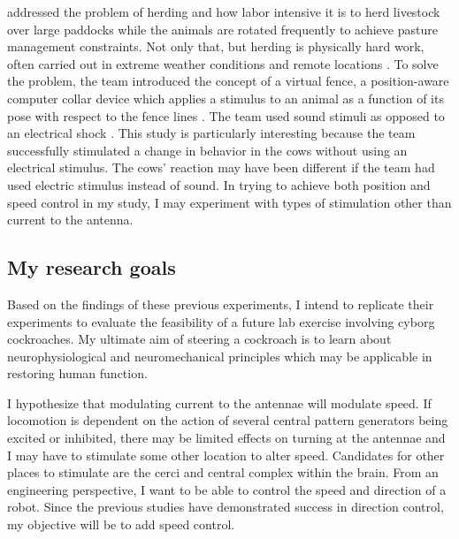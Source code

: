 \citet{Butler2005} addressed the problem of herding and how labor intensive it is to herd livestock over large paddocks while the animals are rotated frequently to achieve pasture management constraints. Not only that, but herding is physically hard work, often carried out in extreme weather conditions and remote locations \citep{Butler2005}. To solve the problem, the team introduced the concept of a virtual fence, a position-aware computer collar device which applies a stimulus to an animal as a function of its pose with respect to the fence lines \citep{Butler2005}. The team used sound stimuli as opposed to an electrical shock \citep{Butler2005}. This study is particularly interesting because the team successfully stimulated a change in behavior in the cows without using an electrical stimulus. The cows' reaction may have been different if the team had used electric stimulus instead of sound. In trying to achieve both position and speed control in my study, I may experiment with types of stimulation other than current to the antenna.


\subsection{My research goals}

Based on the findings of these previous experiments, I intend to replicate their experiments to evaluate the feasibility of a future lab exercise involving cyborg cockroaches. My ultimate aim of steering a cockroach is to learn about neurophysiological and neuromechanical principles which may be applicable in restoring human function. 

I hypothesize that modulating current to the antennae will modulate speed. If locomotion is dependent on the action of several central pattern generators being excited or inhibited, there may be limited effects on turning at the antennae and I may have to stimulate some other location to alter speed. 
Candidates for other places to stimulate are the cerci and central complex within the brain. From an engineering perspective, I want to be able to control the speed and direction of a robot. Since the previous studies have demonstrated success in direction control, my objective will be to add speed control.







